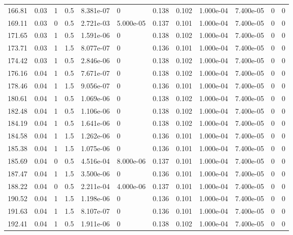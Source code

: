 \documentclass[preview]{standalone}
\begin{document}
{{{\begin{tabular}{L{1.2cm}C{1.2cm} C{0.3cm}C{0.5cm} C{1.4cm}C{1.4cm} C{1.4cm}C{1.4cm} C{1.6cm}C{1.6cm} C{1.6cm}C{1.6cm}}
  166.81  &  0.03  & 1     & 0.5 &  8.381e-07  & 0  &  0.138&   0.102& 1.000e-04 & 7.400e-05   &  0 & 0  \\ 
  169.11  &  0.03  & 0     & 0.5 &  2.721e-03  & 5.000e-05  &  0.137&   0.101& 1.000e-04 & 7.400e-05   &  0 & 0  \\ 
  171.65  &  0.03  & 1     & 0.5 &  1.591e-06  & 0  &  0.138&   0.102& 1.000e-04 & 7.400e-05   &  0 & 0  \\ 
  173.71  &  0.03  & 1     & 1.5 &  8.077e-07  & 0  &  0.136&   0.101& 1.000e-04 & 7.400e-05   &  0 & 0  \\ 
  174.42  &  0.03  & 1     & 0.5 &  2.846e-06  & 0  &  0.138&   0.102& 1.000e-04 & 7.400e-05   &  0 & 0  \\ 
  176.16  &  0.04  & 1     & 0.5 &  7.671e-07  & 0  &  0.138&   0.102& 1.000e-04 & 7.400e-05   &  0 & 0  \\ 
  178.46  &  0.04  & 1     & 1.5 &  9.056e-07  & 0  &  0.136&   0.101& 1.000e-04 & 7.400e-05   &  0 & 0  \\ 
  180.61  &  0.04  & 1     & 0.5 &  1.069e-06  & 0  &  0.138&   0.102& 1.000e-04 & 7.400e-05   &  0 & 0  \\ 
  182.48  &  0.04  & 1     & 0.5 &  1.106e-06  & 0  &  0.138&   0.102& 1.000e-04 & 7.400e-05   &  0 & 0  \\ 
  184.19  &  0.04  & 1     & 0.5 &  1.641e-06  & 0  &  0.138&   0.102& 1.000e-04 & 7.400e-05   &  0 & 0  \\ 
  184.58  &  0.04  & 1     & 1.5 &  1.262e-06  & 0  &  0.136&   0.101& 1.000e-04 & 7.400e-05   &  0 & 0  \\ 
  185.38  &  0.04  & 1     & 1.5 &  1.075e-06  & 0  &  0.136&   0.101& 1.000e-04 & 7.400e-05   &  0 & 0  \\ 
  185.69  &  0.04  & 0     & 0.5 &  4.516e-04  & 8.000e-06  &  0.137&   0.101& 1.000e-04 & 7.400e-05   &  0 & 0  \\ 
  187.47  &  0.04  & 1     & 1.5 &  3.500e-06  & 0  &  0.136&   0.101& 1.000e-04 & 7.400e-05   &  0 & 0  \\ 
  188.22  &  0.04  & 0     & 0.5 &  2.211e-04  & 4.000e-06  &  0.137&   0.101& 1.000e-04 & 7.400e-05   &  0 & 0  \\ 
  190.52  &  0.04  & 1     & 1.5 &  1.198e-06  & 0  &  0.136&   0.101& 1.000e-04 & 7.400e-05   &  0 & 0  \\ 
  191.63  &  0.04  & 1     & 1.5 &  8.107e-07  & 0  &  0.136&   0.101& 1.000e-04 & 7.400e-05   &  0 & 0  \\ 
  192.41  &  0.04  & 1     & 0.5 &  1.911e-06  & 0  &  0.138&   0.102& 1.000e-04 & 7.400e-05   &  0 & 0  \\ 

\end{tabular}}}}
\end{document}
